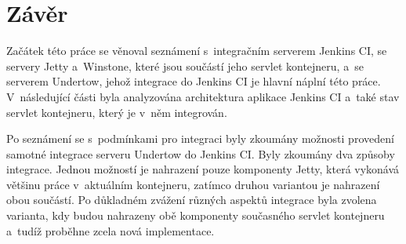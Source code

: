 \chapter{Závěr}
    Začátek této práce se věnoval seznámení s~integračním serverem Jenkins CI,
    se servery Jetty a~Winstone, které jsou součástí jeho servlet kontejneru,
    a~se serverem Undertow, jehož integrace do Jenkins CI je hlavní
    náplní této práce. V~následující části byla analyzována architektura aplikace Jenkins CI
    a~také stav servlet kontejneru, který je v~něm integrován.

    Po seznámení se s~podmínkami pro integraci byly
    zkoumány možnosti provedení samotné integrace serveru Undertow do Jenkins CI.
    Byly zkoumány dva způsoby integrace. Jednou možností je nahrazení pouze komponenty
    Jetty, která vykonává většinu práce v~aktuálním kontejneru, zatímco druhou variantou je
    nahrazení obou součástí. 
    Po důkladném zvážení různých aspektů integrace byla 
    zvolena varianta, kdy budou nahrazeny obě komponenty současného 
    servlet kontejneru a~tudíž proběhne zcela nová implementace.







